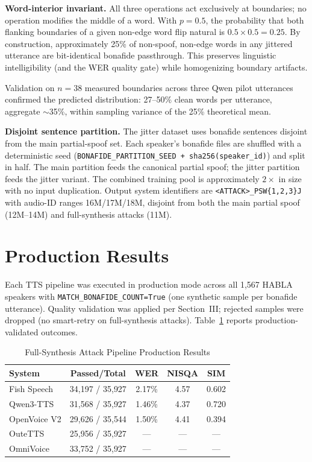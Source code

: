 \documentclass[conference]{IEEEtran}
\begin{document}
\textbf{Word-interior invariant.} All three operations act exclusively at boundaries; no operation modifies the middle of a word. With $p=0.5$, the probability that both flanking boundaries of a given non-edge word flip natural is $0.5 \times 0.5 = 0.25$. By construction, approximately 25\% of non-spoof, non-edge words in any jittered utterance are bit-identical bonafide passthrough. This preserves linguistic intelligibility (and the WER quality gate) while homogenizing boundary artifacts.

Validation on $n=38$ measured boundaries across three Qwen pilot utterances confirmed the predicted distribution: 27--50\% clean words per utterance, aggregate $\sim$35\%, within sampling variance of the 25\% theoretical mean.

\textbf{Disjoint sentence partition.} The jitter dataset uses bonafide sentences disjoint from the main partial-spoof set. Each speaker's bonafide files are shuffled with a deterministic seed (\texttt{BONAFIDE\_PARTITION\_SEED + sha256(speaker\_id)}) and split in half. The main partition feeds the canonical partial spoof; the jitter partition feeds the jitter variant. The combined training pool is approximately $2\times$ in size with no input duplication. Output system identifiers are \texttt{<ATTACK>\_PSW\{1,2,3\}J} with audio-ID ranges 16M/17M/18M, disjoint from both the main partial spoof (12M--14M) and full-synthesis attacks (11M).

\section{Production Results}

Each TTS pipeline was executed in production mode across all 1{,}567 HABLA speakers with \texttt{MATCH\_BONAFIDE\_COUNT=True} (one synthetic sample per bonafide utterance). Quality validation was applied per Section~III; rejected samples were dropped (no smart-retry on full-synthesis attacks). Table~\ref{tab:results} reports production-validated outcomes.

\begin{table}[t]
\caption{Full-Synthesis Attack Pipeline Production Results}
\label{tab:results}
\centering
\small
\begin{tabular}{lcccc}
\toprule
\textbf{System} & \textbf{Passed/Total} & \textbf{WER} & \textbf{NISQA} & \textbf{SIM} \\
\midrule
Fish Speech & 34{,}197 / 35{,}927 & 2.17\% & 4.57 & 0.602 \\
Qwen3-TTS & 31{,}568 / 35{,}927 & 1.46\% & 4.37 & 0.720 \\
OpenVoice V2 & 29{,}626 / 35{,}544 & 1.50\% & 4.41 & 0.394 \\
OuteTTS & 25{,}956 / 35{,}927 & --- & --- & --- \\
OmniVoice & 33{,}752 / 35{,}927 & --- & --- & --- \\
\bottomrule
\end{tabular}
\end{table}
\end{document}
